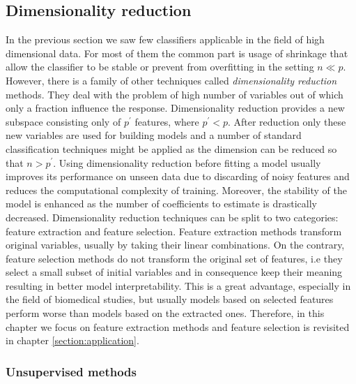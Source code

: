 \documentclass[12pt, wide]{mwart}
\begin{document}
\subsection{Dimensionality reduction}

In the previous section we saw few classifiers applicable in the field of high dimensional data. For most of them the common part is usage of shrinkage that allow the classifier to be stable or prevent from overfitting in the setting $n \ll p$. However, there is a family of other techniques called \textit{dimensionality reduction} methods. They deal with the problem of high number of variables out of which only a fraction influence the response. Dimensionality reduction provides a new subspace consisting only of $p^{\prime}$ features, where $p^{\prime} < p$. After reduction only these new variables are used for building models and a number of standard classification techniques might be applied as the dimension can be reduced so that $n > p^{\prime}$. Using dimensionality reduction before fitting a model usually improves its performance on unseen data due to discarding of noisy features and reduces the computational complexity of training. Moreover, the stability of the model is enhanced as the number of coefficients to estimate is drastically decreased. Dimensionality reduction techniques can be split to two categories: feature extraction and feature selection. Feature extraction methods transform original variables, usually by taking their linear combinations. On the contrary, feature selection methods do not transform the original set of features, i.e they select a small subset of initial variables and in consequence keep their meaning resulting in better model interpretability. This is a great advantage, especially in the field of biomedical studies, but usually models based on selected features perform worse than models based on the extracted ones. Therefore, in this chapter we focus on feature extraction methods and feature selection is revisited in chapter \ref{section:application}.

\subsubsection{Unsupervised methods}
\end{document}
